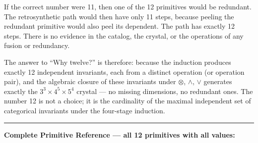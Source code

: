 \documentclass[12pt,a4paper]{article}
\begin{document}
If the correct number were 11, then one of the 12 primitives would be redundant. The retrosynthetic path would then have only 11 steps, because peeling the redundant primitive would also peel its dependent. The path has exactly 12 steps. There is no evidence in the catalog, the crystal, or the operations of any fusion or redundancy.

The answer to ``Why twelve?'' is therefore: because the induction produces exactly 12 independent invariants, each from a distinct operation (or operation pair), and the algebraic closure of these invariants under $\otimes$, $\wedge$, $\vee$ generates exactly the $3^3 \times 4^5 \times 5^4$ crystal --- no missing dimensions, no redundant ones. The number 12 is not a choice; it is the cardinality of the maximal independent set of categorical invariants under the four-stage induction.

\begin{center}
\rule{0.5\textwidth}{0.4pt}
\end{center}

\textbf{Complete Primitive Reference --- all 12 primitives with all values:}
\end{document}
